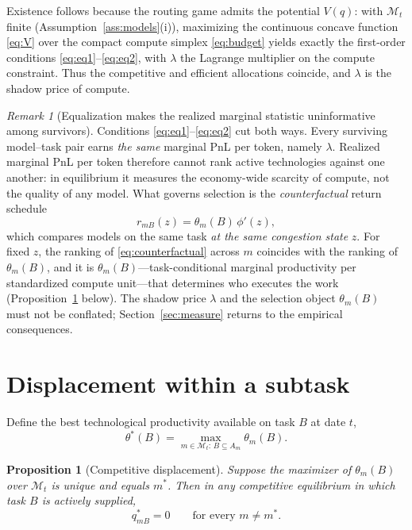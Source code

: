 \documentclass[11pt]{article}
\newtheorem{proposition}{Proposition}
\theoremstyle{definition}
\theoremstyle{remark}
\newtheorem{remark}{Remark}
\begin{document}
Existence follows because the routing game admits the potential $V(q)$: with $\mathcal{M}_t$ finite (Assumption~\ref{ass:models}(i)), maximizing the continuous concave function \eqref{eq:V} over the compact compute simplex \eqref{eq:budget} yields exactly the first-order conditions \eqref{eq:eq1}--\eqref{eq:eq2}, with $\lambda$ the Lagrange multiplier on the compute constraint. Thus the competitive and efficient allocations coincide, and $\lambda$ is the shadow price of compute.

\begin{remark}[Equalization makes the realized marginal statistic uninformative among survivors]
\label{rem:uninformative}
Conditions \eqref{eq:eq1}--\eqref{eq:eq2} cut both ways. Every surviving model--task pair earns \emph{the same} marginal PnL per token, namely $\lambda$. Realized marginal PnL per token therefore cannot rank active technologies against one another: in equilibrium it measures the economy-wide scarcity of compute, not the quality of any model. What governs selection is the \emph{counterfactual} return schedule
\begin{equation}
\label{eq:counterfactual}
r_{mB}(z) = \theta_m(B)\, \phi'(z),
\end{equation}
which compares models on the same task \emph{at the same congestion state} $z$. For fixed $z$, the ranking of \eqref{eq:counterfactual} across $m$ coincides with the ranking of $\theta_m(B)$, and it is $\theta_m(B)$---task-conditional marginal productivity per standardized compute unit---that determines who executes the work (Proposition~\ref{prop:displacement} below). The shadow price $\lambda$ and the selection object $\theta_m(B)$ must not be conflated; Section~\ref{sec:measure} returns to the empirical consequences.
\end{remark}

\section{Displacement within a subtask}
\label{sec:displacement}

Define the best technological productivity available on task $B$ at date $t$,
\begin{equation}
\label{eq:envelope}
\theta^*(B) = \max_{m \in \mathcal{M}_t :\, B \subseteq A_m} \theta_m(B).
\end{equation}

\begin{proposition}[Competitive displacement]
\label{prop:displacement}
Suppose the maximizer of $\theta_m(B)$ over $\mathcal{M}_t$ is unique and equals $m^*$. Then in any competitive equilibrium in which task $B$ is actively supplied,
\begin{equation}
q^*_{mB} = 0 \qquad \text{for every } m \neq m^*.
\end{equation}
\end{proposition}
\end{document}
